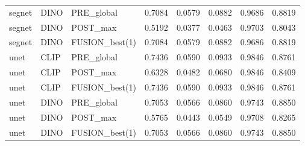 \begin{tabular}{lllrrrrr}
segnet & DINO & PRE_global & 0.7084 & 0.0579 & 0.0882 & 0.9686 & 0.8819 \\
segnet & DINO & POST_max & 0.5192 & 0.0377 & 0.0463 & 0.9703 & 0.8043 \\
segnet & DINO & FUSION_best(1) & 0.7084 & 0.0579 & 0.0882 & 0.9686 & 0.8819 \\
unet & CLIP & PRE_global & 0.7436 & 0.0590 & 0.0933 & 0.9846 & 0.8761 \\
unet & CLIP & POST_max & 0.6328 & 0.0482 & 0.0680 & 0.9846 & 0.8409 \\
unet & CLIP & FUSION_best(1) & 0.7436 & 0.0590 & 0.0933 & 0.9846 & 0.8761 \\
unet & DINO & PRE_global & 0.7053 & 0.0566 & 0.0860 & 0.9743 & 0.8850 \\
unet & DINO & POST_max & 0.5765 & 0.0443 & 0.0549 & 0.9708 & 0.8265 \\
unet & DINO & FUSION_best(1) & 0.7053 & 0.0566 & 0.0860 & 0.9743 & 0.8850 \\
\bottomrule
\end{tabular}

